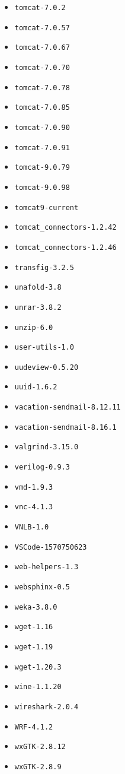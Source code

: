 \begin{multicols}{3}
\begin{itemize}
\item \verb|tomcat-7.0.2|
\item \verb|tomcat-7.0.57|
\item \verb|tomcat-7.0.67|
\item \verb|tomcat-7.0.70|
\item \verb|tomcat-7.0.78|
\item \verb|tomcat-7.0.85|
\item \verb|tomcat-7.0.90|
\item \verb|tomcat-7.0.91|
\item \verb|tomcat-9.0.79|
\item \verb|tomcat-9.0.98|
\item \verb|tomcat9-current|
\item \verb|tomcat_connectors-1.2.42|
\item \verb|tomcat_connectors-1.2.46|
\item \verb|transfig-3.2.5|
\item \verb|unafold-3.8|
\item \verb|unrar-3.8.2|
\item \verb|unzip-6.0|
\item \verb|user-utils-1.0|
\item \verb|uudeview-0.5.20|
\item \verb|uuid-1.6.2|
\item \verb|vacation-sendmail-8.12.11|
\item \verb|vacation-sendmail-8.16.1|
\item \verb|valgrind-3.15.0|
\item \verb|verilog-0.9.3|
\item \verb|vmd-1.9.3|
\item \verb|vnc-4.1.3|
\item \verb|VNLB-1.0|
\item \verb|VSCode-1570750623|
\item \verb|web-helpers-1.3|
\item \verb|websphinx-0.5|
\item \verb|weka-3.8.0|
\item \verb|wget-1.16|
\item \verb|wget-1.19|
\item \verb|wget-1.20.3|
\item \verb|wine-1.1.20|
\item \verb|wireshark-2.0.4|
\item \verb|WRF-4.1.2|
\item \verb|wxGTK-2.8.12|
\item \verb|wxGTK-2.8.9|

\end{itemize}
\end{multicols}
